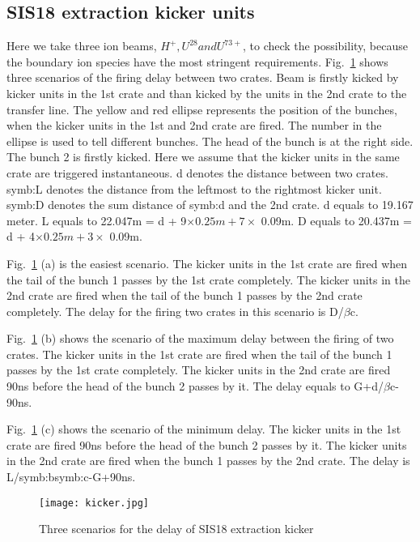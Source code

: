 \subsection{SIS18 extraction kicker units}
Here we take three ion beams, $H^+, U^{28} and U^{73+}$, to check the possibility, because the boundary ion species have the most stringent requirements. Fig.~\ref{kicker} shows three scenarios of the firing delay between two crates. Beam is firstly kicked by kicker units in the 1st crate and than kicked by the units in the 2nd crate to the transfer line. The yellow and red ellipse represents the position of the bunches, when the kicker units in the 1st and 2nd crate are fired. The number in the ellipse is used to tell different bunches. The head of the bunch is at the right side. The bunch 2 is firstly kicked. Here we assume that the kicker units in the same crate are triggered instantaneous. d denotes the distance between two crates. \gls{symb:L} denotes the distance from the leftmost to the rightmost kicker unit. \gls{symb:D} denotes the sum distance of \gls{symb:d} and the 2nd crate. d equals to 19.167 meter. L equals to 22.047m = d + 9$\times 0.25m + 7\times$ 0.09m. D equals to 20.437m = d + 4$\times 0.25m + 3\times$ 0.09m.

Fig.~\ref{kicker} (a) is the easiest scenario. The kicker units in the 1st crate are fired when the tail of the bunch 1 passes by the 1st crate completely. The kicker units in the 2nd crate are fired when the tail of the bunch 1 passes by the 2nd crate completely. The delay for the firing two crates in this scenario is D/$\beta$c. 

Fig.~\ref{kicker} (b) shows the scenario of the maximum delay between the firing of two crates. The kicker units in the 1st crate are fired when the tail of the bunch 1 passes by the 1st crate completely. The kicker units in the 2nd crate are fired 90ns before the head of the bunch 2 passes by it. The delay equals to G+d/$\beta$c-90ns.

Fig.~\ref{kicker} (c) shows the scenario of the minimum delay. The kicker units in the 1st crate are fired 90ns before the head of the bunch 2 passes by it. The kicker units in the 2nd crate are fired when the bunch 1 passes by the 2nd crate. The delay is L/\gls{symb:b}\gls{symb:c}-G+90ns.

\begin{figure}[H]
   \centering   
   \texttt{[image: kicker.jpg]}
   \caption{Three scenarios for the delay of SIS18 extraction kicker}
   \label{kicker}
\end{figure}

